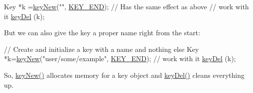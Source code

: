 \begin{DoxyCodeInclude}
Key *k =\hyperlink{group__key_gad23c65b44bf48d773759e1f9a4d43b89}{keyNew}(\textcolor{stringliteral}{""}, \hyperlink{group__key_gga91fb3178848bd682000958089abbaf40aa8adb6fcb92dec58fb19410eacfdd403}{KEY\_END}); \textcolor{comment}{// Has the same effect as above}
\textcolor{comment}{// work with it}
\hyperlink{group__key_ga3df95bbc2494e3e6703ece5639be5bb1}{keyDel} (k);
\end{DoxyCodeInclude}
 But we can also give the key a proper name right from the start\-:


\begin{DoxyCodeInclude}
\textcolor{comment}{// Create and initialize a key with a name and nothing else}
Key *k=\hyperlink{group__key_gad23c65b44bf48d773759e1f9a4d43b89}{keyNew}(\textcolor{stringliteral}{"user/some/example"}, \hyperlink{group__key_gga91fb3178848bd682000958089abbaf40aa8adb6fcb92dec58fb19410eacfdd403}{KEY\_END});
\textcolor{comment}{// work with it}
\hyperlink{group__key_ga3df95bbc2494e3e6703ece5639be5bb1}{keyDel} (k);
\end{DoxyCodeInclude}
 So, \hyperlink{group__key_gad23c65b44bf48d773759e1f9a4d43b89}{key\-New()} allocates memory for a key object and \hyperlink{group__key_ga3df95bbc2494e3e6703ece5639be5bb1}{key\-Del()} cleans everything up.

